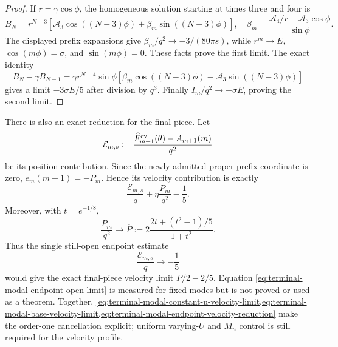 \begin{proof}
If $r=\gamma\cos\phi$, the homogeneous solution starting at times three and
four is
\[
 B_N=r^{N-3}\left[\mathcal A_3\cos((N-3)\phi)
 +\beta_m\sin((N-3)\phi)\right],
 \quad
 \beta_m=\frac{\mathcal A_4/r-\mathcal A_3\cos\phi}{\sin\phi}.
\]
The displayed prefix expansions give
$\beta_m/q^2\to-3/(80\pi s)$, while
$r^m\to E$, $\cos(m\phi)=\sigma$, and $\sin(m\phi)=0$.  These facts prove
the first limit.  The exact identity
\[
 B_N-\gamma B_{N-1}
 =\gamma r^{N-4}\sin\phi\left[
 \beta_m\cos((N-3)\phi)-\mathcal A_3\sin((N-3)\phi)
 \right]
\]
gives a limit $-3\sigma E/5$ after division by $q^3$.  Finally
$I_m/q^2\to-\sigma E$, proving the second limit.
\end{proof}

There is also an exact reduction for the final piece.  Let
\begin{equation*}
 \mathcal E_{m,s}:=\frac{\widehat F_{m+1}^{\rm ev}(\theta)-A_{m+1}(m)}{q^2}
\end{equation*}
be its position contribution.  Since the newly admitted proper-prefix
coordinate is zero, $e_m(m-1)=-P_m$.  Hence its velocity contribution is
exactly
\begin{equation}
 \frac{\mathcal E_{m,s}}q+\eta\frac{P_m}{q^2}-\frac15.
 \label{eq:terminal-modal-endpoint-velocity-reduction}
\end{equation}
Moreover, with $t=e^{-1/8}$,
\begin{equation}
 \frac{P_m}{q^2}\longrightarrow
 \overline P:=2\frac{2t+(t^2-1)/5}{1+t^2}.
 \label{eq:terminal-modal-frontier-limit}
\end{equation}
Thus the single still-open endpoint estimate
\begin{equation}
 \frac{\mathcal E_{m,s}}q\longrightarrow-\frac15
 \label{eq:terminal-modal-endpoint-open-limit}
\end{equation}
would give the exact final-piece velocity limit
$\overline P/2-2/5$.  Equation
\eqref{eq:terminal-modal-endpoint-open-limit} is measured for fixed modes but
is not proved or used as a theorem.  Together,
\cref{eq:terminal-modal-constant-u-velocity-limit,eq:terminal-modal-base-velocity-limit,eq:terminal-modal-endpoint-velocity-reduction}
make the order-one cancellation explicit; uniform varying-$U$ and $M_n$
control is still required for the velocity profile.
